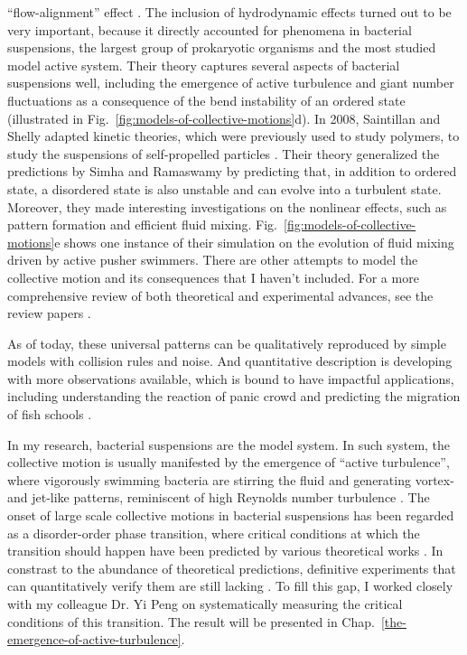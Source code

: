 ``flow-alignment'' effect \cite{Forster1974}. The inclusion of hydrodynamic effects turned out to be very important, because it directly accounted for phenomena in bacterial suspensions, the largest group of prokaryotic organisms and the most studied model active system. Their theory captures several aspects of bacterial suspensions well, including the emergence of active turbulence and giant number fluctuations as a consequence of the bend instability of an ordered state (illustrated in Fig.~\ref{fig:models-of-collective-motions}d). In 2008, Saintillan and Shelly adapted kinetic theories, which were previously used to study polymers, to study the suspensions of self-propelled particles \cite{Saintillan2008a, Saintillan2008b}. Their theory generalized the predictions by Simha and Ramaswamy by predicting that, in addition to ordered state, a disordered state is also unstable and can evolve into a turbulent state. Moreover, they made interesting investigations on the nonlinear effects, such as pattern formation and efficient fluid mixing. Fig.~\ref{fig:models-of-collective-motions}e shows one instance of their simulation on the evolution of fluid mixing driven by active pusher swimmers. There are other attempts to model the collective motion and its consequences that I haven't included. For a more comprehensive review of both theoretical and experimental advances, see the review papers
\cite{Ramaswamy2010, Koch2011, Marchetti2013}.

As of today, these universal patterns can be qualitatively reproduced by simple models with collision rules and noise. And quantitative description is developing with more observations available, which is bound to have impactful applications, including understanding the reaction of panic crowd and predicting the migration of fish schools
\cite{Vicsek2012}.

In my research, bacterial suspensions are the model system. In such system, the collective motion is usually manifested by the emergence of ``active turbulence'', where vigorously swimming bacteria are stirring the fluid and generating vortex- and jet-like patterns, reminiscent of high Reynolds number turbulence \cite{Dombrowski2004, Sokolov2007, Sokolov2009,
 Sokolov2012, Ishikawa2011, Wensink2012, Dunkel2013, Peng2020}. The onset of large scale collective motions in bacterial suspensions has been regarded as a disorder-order phase transition, where critical conditions at which the transition should happen have been predicted by various theoretical works
 \cite{Baskaran2009, Koch2011, Marchetti2013, Saintillan2015}. In constrast to the abundance of theoretical predictions, definitive experiments that can quantitatively verify them are  still lacking \cite{Koch2011, Saintillan2015}. To fill this gap, I worked closely with my colleague Dr. Yi Peng on systematically measuring the critical conditions of this transition. The result will be presented in
 Chap.~\ref{the-emergence-of-active-turbulence}.

